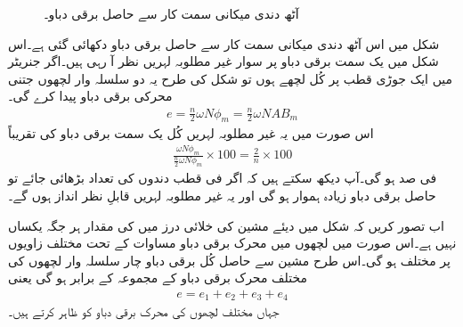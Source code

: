 \begin{figure}
\centering
\caption{آٹھ دندی میکانی سمت کار سے حاصل برقی دباو۔}
\label{شکل_یکسمتی-آٹھ_دندوں_سمتکار_کی_لہر}
\end{figure}

شکل   میں اس آٹھ دندی میکانی سمت کار سے حاصل برقی دباو دکھائی گئی ہے۔اس شکل میں یک سمت  برقی دباو پر سوار غیر مطلوبہ  لہریں نظر آ رہی ہیں۔اگر جنریٹر میں ایک جوڑی قطب پر کُل  لچھے ہوں تو شکل   کی طرح یہ دو   سلسلہ وار لچھوں جتنی محرکی برقی دباو پیدا کرے گی۔
\begin{align}\label{مساوات_یکسمتی_پیدا_دباو_الف}
e=\frac{n}{2} \omega N \phi_m=\frac{n}{2} \omega N A B_m
\end{align}
اس صورت میں یہ غیر مطلوبہ لہریں کُل یک سمت  برقی دباو کی تقریباً
\begin{align}\label{مساوات_یکسمتی_فی_صد_لہر}
\frac{\omega N \phi_m}{\frac{n}{2} \omega N \phi_m} \times 100=\frac{2}{n} \times 100
\end{align}
فی صد ہو گی۔آپ دیکھ سکتے ہیں کہ اگر فی قطب دندوں کی تعداد بڑھائی جائے تو حاصل برقی دباو زیادہ ہموار ہو گی اور یہ غیر مطلوبہ لہریں قابلِ نظر انداز ہوں گے۔

اب تصور کریں کہ شکل   میں دیئے مشین کی خلائی درز میں  کی مقدار ہر جگہ یکساں نہیں ہے۔اس صورت میں لچھوں میں محرک برقی دباو مساوات   کے تحت مختلف زاویوں پر مختلف ہو گی۔اس طرح مشین سے حاصل کُل برقی دباو چار سلسلہ وار لچھوں کی مختلف محرک برقی دباو کے مجموعہ کے برابر ہو گی یعنی
\begin{align} \label{مساوات_یکسمتی_کل_دباو_مجموعہ}
e=e_1+e_2+e_3+e_4
\end{align}
جہاں   مختلف لچھوں کی محرک برقی دباو کو ظاہر کرتے ہیں۔

